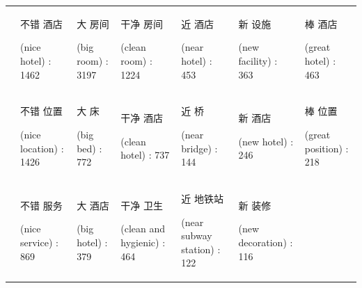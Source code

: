 \documentclass[smallextended,natbib]{svjour3}       %
\begin{document}
\begin{landscape}
\begin{table}[p]
{\begin{tabular}{|c|l|l|l|l|l|l|}
         &
          \begin{CJK}{UTF8}{gbsn}不错 酒店\end{CJK} (nice hotel) : 1462 &
          \begin{CJK}{UTF8}{gbsn}大 房间\end{CJK} (big room) : 3197 &
          \begin{CJK}{UTF8}{gbsn}干净 房间\end{CJK} (clean room) : 1224 &
          \begin{CJK}{UTF8}{gbsn}近 酒店\end{CJK} (near hotel) : 453 &
          \begin{CJK}{UTF8}{gbsn}新 设施\end{CJK} (new facility) : 363 &
          \begin{CJK}{UTF8}{gbsn}棒 酒店\end{CJK} (great hotel) : 463 \\
         &
          \begin{CJK}{UTF8}{gbsn}不错 位置\end{CJK} (nice location) : 1426 &
          \begin{CJK}{UTF8}{gbsn}大 床\end{CJK} (big bed) : 772 &
          \begin{CJK}{UTF8}{gbsn}干净 酒店\end{CJK} (clean hotel) : 737 &
          \begin{CJK}{UTF8}{gbsn}近 桥\end{CJK} (near bridge) : 144 &
          \begin{CJK}{UTF8}{gbsn}新 酒店\end{CJK} (new hotel) : 246 &
          \begin{CJK}{UTF8}{gbsn}棒 位置\end{CJK} (great position) : 218 \\
         &
          \begin{CJK}{UTF8}{gbsn}不错 服务\end{CJK} (nice service) : 869 &
          \begin{CJK}{UTF8}{gbsn}大 酒店\end{CJK} (big hotel) : 379 &
          \begin{CJK}{UTF8}{gbsn}干净 卫生\end{CJK} (clean and hygienic) : 464 &
          \begin{CJK}{UTF8}{gbsn}近 地铁站\end{CJK} (near subway station) : 122 &
          \begin{CJK}{UTF8}{gbsn}新 装修\end{CJK} (new decoration) : 116 &

\end{tabular}}
\end{table}
\end{landscape}
\end{document}
